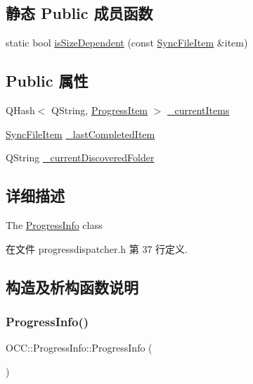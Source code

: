 \subsection*{静态 Public 成员函数}
\begin{DoxyCompactItemize}
\item 
static bool \hyperlink{class_o_c_c_1_1_progress_info_a31bf3330cee102b123b7ad869d46fce1}{is\+Size\+Dependent} (const \hyperlink{class_o_c_c_1_1_sync_file_item}{Sync\+File\+Item} \&item)
\end{DoxyCompactItemize}
\subsection*{Public 属性}
\begin{DoxyCompactItemize}
\item 
Q\+Hash$<$ Q\+String, \hyperlink{struct_o_c_c_1_1_progress_info_1_1_progress_item}{Progress\+Item} $>$ \hyperlink{class_o_c_c_1_1_progress_info_a0beccc816e99ae909a6ec4466edb46bf}{\+\_\+current\+Items}
\item 
\hyperlink{class_o_c_c_1_1_sync_file_item}{Sync\+File\+Item} \hyperlink{class_o_c_c_1_1_progress_info_acdfbd2cc5003d743ab483413be80d24b}{\+\_\+last\+Completed\+Item}
\item 
Q\+String \hyperlink{class_o_c_c_1_1_progress_info_a5f46791fcf0f5dab9ec87b236d1b3a73}{\+\_\+current\+Discovered\+Folder}
\end{DoxyCompactItemize}


\subsection{详细描述}
The \hyperlink{class_o_c_c_1_1_progress_info}{Progress\+Info} class 

在文件 progressdispatcher.\+h 第 37 行定义.



\subsection{构造及析构函数说明}
\mbox{\label{class_o_c_c_1_1_progress_info_a3621453d1da2ab09c89d89608e95ba5b}} 
\subsubsection{\texorpdfstring{Progress\+Info()}{ProgressInfo()}}
{\footnotesize\ttfamily O\+C\+C\+::\+Progress\+Info\+::\+Progress\+Info (\begin{DoxyParamCaption}{ }\end{DoxyParamCaption})}



